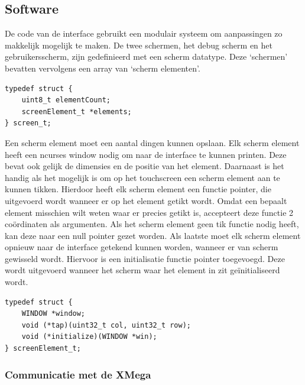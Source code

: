 \subsection{Software}
De code van de interface gebruikt een modulair systeem om aanpassingen zo makkelijk mogelijk te maken. De twee schermen, het debug scherm en het gebruikersscherm, zijn gedefinieerd met een scherm datatype.
Deze `schermen' bevatten vervolgens een array van `scherm elementen'.

\begin{minipage}{\textwidth}
    \begin{lstlisting}[caption={Het datatype van de schermen},captionpos=b,label={lst:screen_t},style=c,xleftmargin=.\textwidth,xrightmargin=.\textwidth]
typedef struct {
    uint8_t elementCount;
    screenElement_t *elements;
} screen_t;
    \end{lstlisting}
\end{minipage}

Een scherm element moet een aantal dingen kunnen opslaan. Elk scherm element heeft een ncurses window nodig om naar de interface te kunnen printen. Deze bevat ook gelijk de dimensies en de positie van het element.
Daarnaast is het handig als het mogelijk is om op het touchscreen een scherm element aan te kunnen tikken. Hierdoor heeft elk scherm element een functie pointer, die uitgevoerd wordt wanneer er op het element getikt wordt. Omdat een bepaalt element misschien wilt weten waar er precies getikt is, accepteert deze functie 2 coördinaten als argumenten. Als het scherm element geen tik functie nodig heeft, kan deze naar een null pointer gezet worden. Als laatste moet elk scherm element opnieuw naar de interface getekend kunnen worden, wanneer er van scherm gewisseld wordt. Hiervoor is een initialisatie functie pointer toegevoegd. Deze wordt uitgevoerd wanneer het scherm waar het element in zit geïnitialiseerd wordt.

\begin{lstlisting}[caption={Het datatype van de scherm elementen},captionpos=b,label={lst:screenElement_t},style=c,xleftmargin=.\textwidth,xrightmargin=.\textwidth]
typedef struct {
    WINDOW *window;
    void (*tap)(uint32_t col, uint32_t row);
    void (*initialize)(WINDOW *win);
} screenElement_t;    
\end{lstlisting}

\subsubsection*{Communicatie met de XMega}

